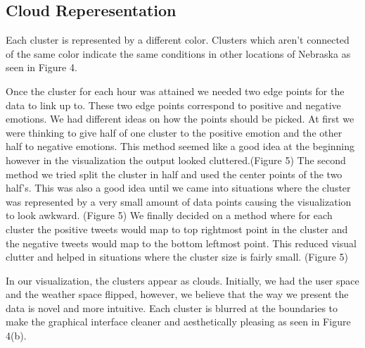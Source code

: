 \documentclass[journal]{vgtc}                %
\begin{document}
\subsection{Cloud Reperesentation}
Each cluster is represented by a different color. Clusters which aren't connected of the same color indicate the same conditions in other locations of Nebraska as seen in Figure 4.

Once the cluster for each hour was attained we needed two edge points for the data to link up to. These two edge points correspond to positive and negative emotions. We had different ideas on how the points should be picked. At first we were thinking to give half of one cluster to the positive emotion and the other half to negative emotions. This method seemed like a good idea at the beginning however in the visualization the output looked cluttered.(Figure 5) The second method we tried split the cluster in half and used the center points of the two half's. This was also a good idea until we came into situations where the cluster was represented by a very small amount of data points causing the visualization to look awkward. (Figure 5) We finally decided on a method where for each cluster the positive tweets would map to top rightmost point in the cluster and the negative tweets would map to the bottom leftmost point. This reduced visual clutter and helped in situations where the cluster size is fairly small. (Figure 5)

In our visualization, the clusters appear as clouds. Initially, we had the user space and the weather space flipped, however, we believe that the way we present the data is novel and more intuitive. Each cluster is blurred at the boundaries to make the graphical interface cleaner and aesthetically pleasing as seen in Figure 4(b).
\end{document}
